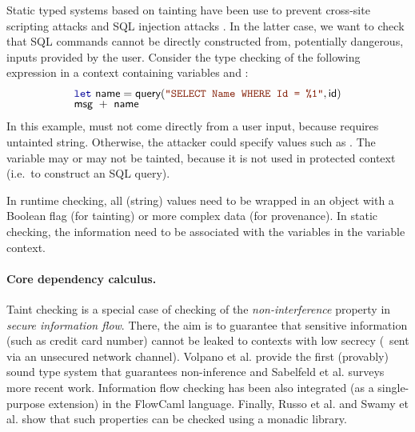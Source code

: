 Static typed systems based on tainting have been use to prevent cross-site scripting attacks 
\cite{app-tainting-xss} and SQL injection attacks \cite{app-tainting-sql,app-tainting-wasp}. 
In the latter case, we want to check that SQL commands cannot be directly constructed from,
potentially dangerous, inputs provided by the user. Consider the type checking of the following 
expression in a context containing variables  and :
%
\begin{equation*}
\begin{array}{l}
\kvd{let}~\ident{name} = \ident{query}(\str{SELECT Name WHERE Id = \%1}, \ident{id})\\[-0.25em]
\ident{msg}~+~\ident{name}
\end{array}
\end{equation*}
%
In this example,  must not come directly from a user input, because  requires 
untainted string. Otherwise, the attacker could specify values such as . 
The variable  may or may not be tainted, because it is not used in protected context 
(i.e.~to construct an SQL query). 

In runtime checking, all (string) values need to be wrapped in an object with a Boolean 
flag (for tainting) or more complex data (for provenance). In static checking, the information
need to be associated with the variables in the variable context. 


\paragraph{Core dependency calculus.}
Taint checking is a special case of checking of the \emph{non-interference} property 
in \emph{secure information flow}. There, the aim is to guarantee that sensitive information (such
as credit card number) cannot be leaked to contexts with low secrecy (\eg~sent via an unsecured
network channel). Volpano et al. \cite{app-secure-flow} provide the first (provably) sound type 
system that guarantees non-inference and Sabelfeld et al. \cite{app-secure-information-flow} surveys
more recent work. Information flow checking has been also integrated (as a single-purpose
extension) in the FlowCaml \cite{app-security-flowcaml} language. Finally, Russo et al. and 
Swamy et al. \cite{monad-secure-flow,monads-lightweight-ml} show that such properties can be checked
using a monadic library.

